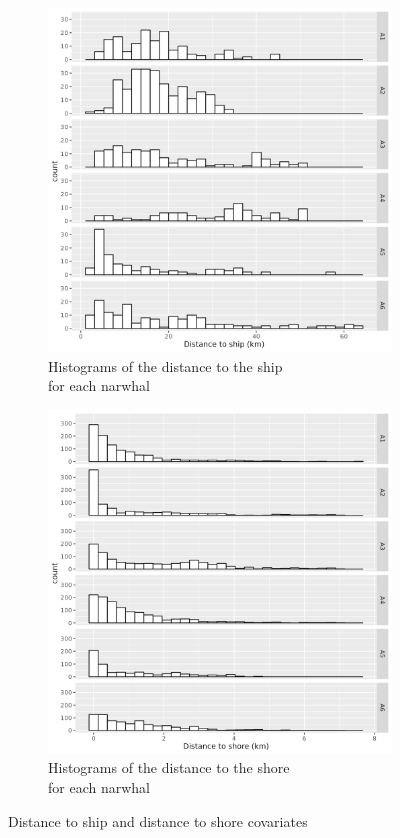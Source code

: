 \documentclass[11pt]{article}
\newcommand {\1}{\mathbb{1}}
\begin{document}
\begin{figure}[H]
	\centering
	\begin{subfigure}{0.48\textwidth}
		\centering
		\includegraphics[scale=0.45]{images/data_exploration/Dship_histo.png}
		\caption{Histograms of the distance to the ship \\ for each narwhal}
	\end{subfigure}
	\begin{subfigure}{0.48\textwidth}
		\centering
		\includegraphics[scale=0.45]{images/data_exploration/Dshore_histo.png}
		\caption{Histograms of the distance to the shore \\ for each narwhal}
	\end{subfigure}
	\caption{Distance to ship and distance to shore covariates}
	\label{fig: distance to shore and distance to ship histograms}
\end{figure}
\end{document}
